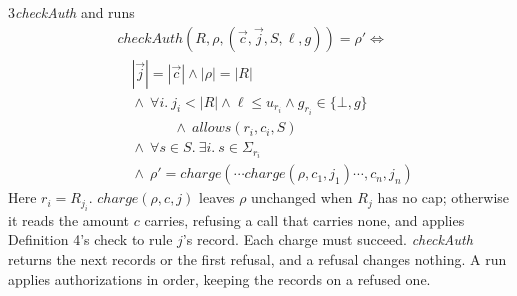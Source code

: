 \begin{perchdefinition}{3}{\emph{checkAuth} and runs}\label{def:check-auth-and-runs}
\[\begin{aligned}&\mathit{checkAuth}(R, \rho, (\vec c, \vec j, S, \ell, g)) = \rho' \iff\\
&\quad |\vec j| = |\vec c| \land |\rho| = |R|\\
&\quad \land\ \forall i.\ j_i < |R| \land \ell \le u_{r_i} \land g_{r_i} \in \{\bot, g\}\\
&\qquad\qquad \land\ \mathit{allows}(r_i, c_i, S)\\
&\quad \land\ \forall s \in S.\ \exists i.\ s \in \Sigma_{r_i}\\
&\quad \land\ \rho' = \mathit{charge}(\cdots \mathit{charge}(\rho, c_1, j_1) \cdots, c_n, j_n)\end{aligned}\]
Here \(r_i = R_{j_i}\). \(\mathit{charge}(\rho, c, j)\) leaves \(\rho\) unchanged when \(R_j\) has no cap; otherwise it reads the amount \(c\) carries, refusing a call that carries none, and applies Definition 4's check to rule \(j\)'s record. Each charge must succeed. \emph{checkAuth} returns the next records or the first refusal, and a refusal changes nothing. A run applies authorizations in order, keeping the records on a refused one.
\end{perchdefinition}
